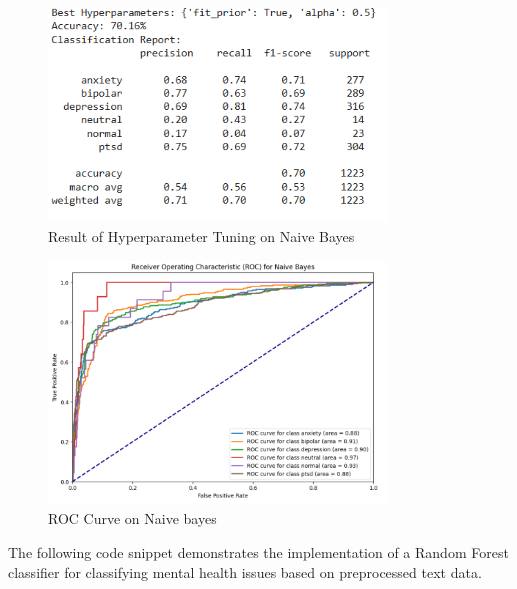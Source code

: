 \begin{figure}[h!]  
    \centering
    \includegraphics[width=0.8\textwidth]{Images/Output HPT NB.png}  
    \caption{Result of Hyperparameter Tuning on Naive Bayes}
    \label{HPT NB}  %
\end{figure}

\begin{figure}[h!]  
    \centering
    \includegraphics[width=0.8\textwidth]{Images/ROC NB.png}  
    \caption{ROC Curve on Naive bayes}
    \label{ROC NB}  %
\end{figure}

\noindent
The following code snippet demonstrates the implementation of a Random Forest classifier for classifying mental health issues based on preprocessed text data.

